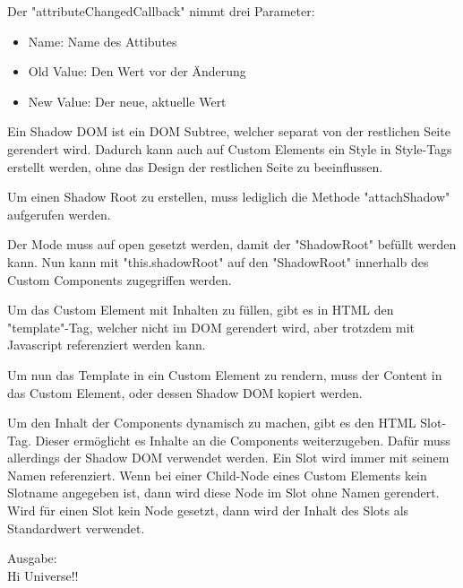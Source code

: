 Der "attributeChangedCallback" nimmt drei Parameter:
\begin{itemize}[itemsep=0em]
    \item 	Name: Name des Attibutes
    \item 	Old Value: Den Wert vor der Änderung
    \item 	New Value: Der neue, aktuelle Wert 
\end{itemize}



Ein Shadow DOM ist ein DOM Subtree, welcher separat von der restlichen Seite gerendert wird. Dadurch kann auch auf Custom Elements ein Style in Style-Tags erstellt werden, ohne das Design der restlichen Seite zu beeinflussen.

Um einen Shadow Root zu erstellen, muss lediglich die Methode "attachShadow" aufgerufen werden. 


Der Mode muss auf open gesetzt werden, damit der "ShadowRoot" befüllt werden kann. Nun kann mit "this.shadowRoot" auf den "ShadowRoot" innerhalb des Custom Components zugegriffen werden.
\cite{MDNShadowRoot}


Um das Custom Element mit Inhalten zu füllen, gibt es in HTML den "template"-Tag, welcher nicht im DOM gerendert wird, aber trotzdem mit Javascript referenziert werden kann. 


Um nun das Template in ein Custom Element zu rendern, muss der Content in das Custom Element, oder dessen Shadow DOM kopiert werden.



Um den Inhalt der Components dynamisch zu machen, gibt es den HTML Slot-Tag. Dieser ermöglicht es Inhalte an die Components weiterzugeben. Dafür muss allerdings der Shadow DOM verwendet werden. Ein Slot wird immer mit seinem Namen referenziert. Wenn bei einer Child-Node eines Custom Elements kein Slotname angegeben ist, dann wird diese Node im Slot ohne Namen gerendert. Wird für einen Slot kein Node gesetzt, dann wird der Inhalt des Slots als Standardwert verwendet. 
\cite{MDNSlots}




Ausgabe: \\
Hi Universe!!